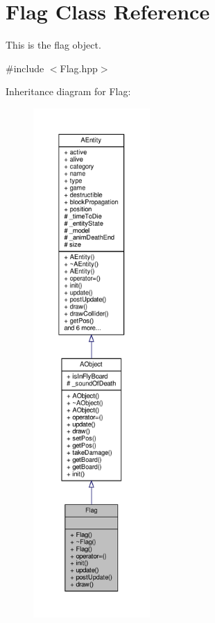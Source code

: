 \hypertarget{class_flag}{}\section{Flag Class Reference}
\label{class_flag}


This is the flag object.  




{\ttfamily \#include $<$Flag.\+hpp$>$}



Inheritance diagram for Flag\+:
\nopagebreak
\begin{figure}[H]
\begin{center}
\leavevmode
\includegraphics[height=550pt]{class_flag__inherit__graph}
\end{center}
\end{figure}


